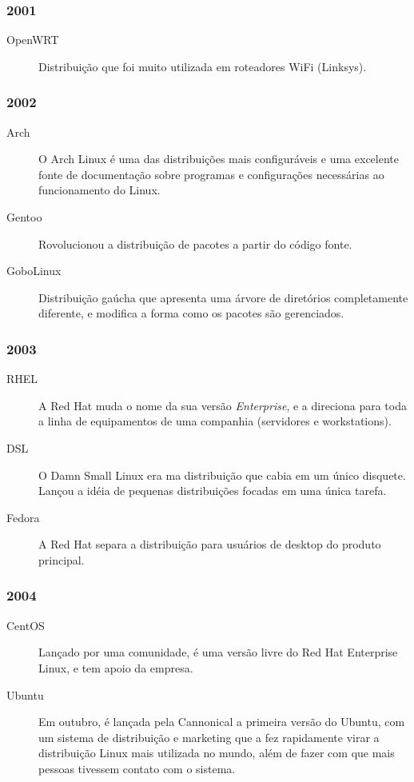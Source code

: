 \documentclass[aspectratio=169,14pt]{beamer}
\begin{document}
\begin{frame}
    \frametitle{2001}
    \begin{description}
        \item[OpenWRT] Distribuição que foi muito utilizada em roteadores
        WiFi (Linksys).
    \end{description}
\end{frame}

\begin{frame}
    \frametitle{2002}
    \begin{description}
        \item[Arch] O Arch Linux é uma das distribuições mais configuráveis
        e uma excelente fonte de documentação sobre programas e configurações
        necessárias ao funcionamento do Linux.
        \item[Gentoo] Rovolucionou a distribuição de pacotes a partir do
        código fonte.
        \item[GoboLinux] Distribuição gaúcha que apresenta uma árvore de
        diretórios completamente diferente, e modifica a forma como os
        pacotes são gerenciados.
    \end{description}
\end{frame}

\begin{frame}
    \frametitle{2003}
    \begin{description}
        \item[RHEL] A Red Hat muda o nome da sua versão \emph{Enterprise},
        e a direciona para toda a linha de equipamentos de uma companhia
        (servidores e workstations).
        \item[DSL] O Damn Small Linux era ma distribuição que cabia em
        um único disquete. Lançou a idéia de pequenas distribuições
        focadas em uma única tarefa.
        \item[Fedora] A Red Hat separa a distribuição para usuários de
        desktop do produto principal.
    \end{description}
\end{frame}

\begin{frame}
    \frametitle{2004}
    \begin{description}
        \item[CentOS] Lançado por uma comunidade, é uma versão livre do
        Red Hat Enterprise Linux, e tem apoio da empresa.
        \item[Ubuntu] Em outubro, é lançada pela Cannonical a primeira versão do Ubuntu,
        com um sistema de distribuição e marketing que a fez rapidamente
        virar a distribuição Linux mais utilizada no mundo, além de fazer
        com que mais pessoas tivessem contato com o sistema.
    \end{description}
\end{frame}
\end{document}
